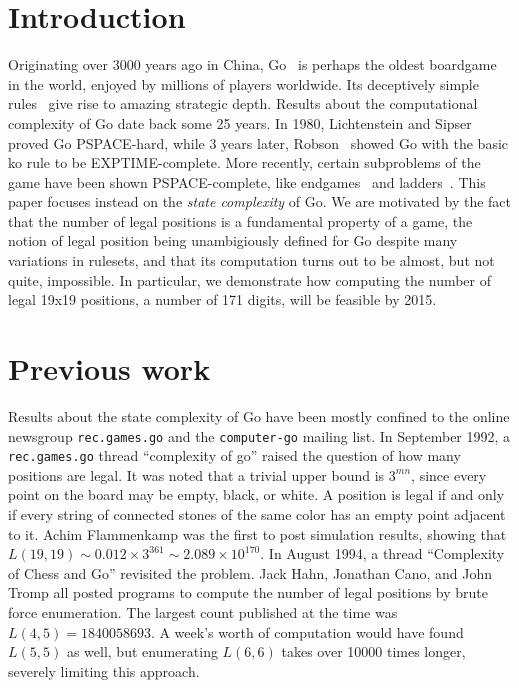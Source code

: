 \documentclass{article}
\begin{document}
\section{Introduction}
Originating over 3000 years ago in China,
Go~\cite{gowiki} is perhaps the oldest boardgame in the world,
enjoyed by millions of players worldwide.
Its deceptively simple rules~\cite{gorules}
give rise to amazing strategic depth.
Results about the computational complexity of Go
date back some 25 years. In 1980, Lichtenstein and Sipser~\cite{LS80}
proved Go PSPACE-hard, while 3 years later, Robson~\cite{R83}
showed Go with the basic ko rule to be EXPTIME-complete. More recently,
certain subproblems of the game have been shown PSPACE-complete,
like endgames~\cite{W02} and ladders~\cite{CT00}.
This paper focuses instead on the {\em state complexity} of Go.
We are motivated by the fact that
the number of legal positions is a fundamental property of a game,
the notion of legal position being unambigiously defined for Go
despite many variations in rulesets, and that its computation turns
out to be almost, but not quite, impossible. In particular, we
demonstrate how computing the number of legal 19x19 positions,
a number of 171 digits, will be feasible by 2015.

\section{Previous work}
Results about the state complexity of Go have been mostly confined
to the online newsgroup {\tt rec.games.go} and the {\tt computer-go}
mailing list.
In September 1992, a {\tt rec.games.go} thread ``complexity of go''
raised the question of how many positions are legal.
It was noted that a trivial upper bound is $3^{mn}$,
since every point on the board may be empty, black,
or white. A position is legal if and only if every string of
connected stones of the same color has an empty point adjacent to it.
Achim Flammenkamp was the first to post simulation results, showing
that $L(19,19) \sim 0.012 \times 3^{361} \sim 2.089 \times 10^{170}$.
In August 1994, a thread ``Complexity of Chess and Go'' revisited the problem.
Jack Hahn, Jonathan Cano, and John Tromp all posted programs to compute the
number of legal positions by brute force enumeration.
The largest count published at the time was $L(4,5)=1840058693$.
A week's worth of computation would have found $L(5,5)$ as well,
but enumerating $L(6,6)$ takes over 10000 times longer, severely
limiting this approach.
\end{document}
